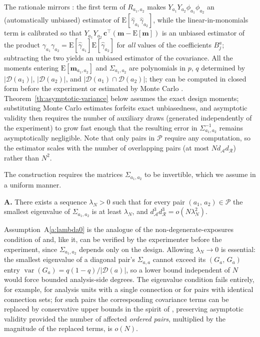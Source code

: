 \documentclass[sigconf]{acmart}
\newcounter{assumption}
\newenvironment{assumption}{\refstepcounter{assumption}\par\medskip\noindent\textbf{A\theassumption.}\enspace}{\par\medskip}
\newcommand{\E}{\mathrm E}
\DeclareMathOperator{\var}{var}
\begin{document}
The rationale mirrors \cite[Section~5.1]{harshaw2023erl}: the first term of $R_{a_1,a_2}$ makes $Y_{a_1}Y_{a_2}\phi_{a_1}\phi_{a_2}$ an (automatically unbiased) estimator of $\E[\hat\gamma_{a_1}\hat\gamma_{a_2}]$, while the linear-in-monomials term is calibrated so that $Y_{a_1}Y_{a_2}\,\mathbf c^{\top}(\mathbf m-\E[\mathbf m])$ is an unbiased estimator of the product $\gamma_{a_1}\gamma_{a_2}=\E[\hat\gamma_{a_1}]\E[\hat\gamma_{a_2}]$ for \emph{all} values of the coefficients $B^a_j$; subtracting the two yields an unbiased estimator of the covariance. All the moments entering $\E[\mathbf m_{a_1,a_2}]$ and $\Sigma_{a_1,a_2}$ are polynomials in $p$, $q$ determined by $|\mathcal D(a_1)|$, $|\mathcal D(a_2)|$, and $|\mathcal D(a_1)\cap\mathcal D(a_2)|$; they can be computed in closed form before the experiment or estimated by Monte Carlo \cite{fattorini2006applying}. Theorem~\ref{th:asymptotic-variance} below assumes the exact design moments; substituting Monte Carlo estimates forfeits exact unbiasedness, and asymptotic validity then requires the number of auxiliary draws (generated independently of the experiment) to grow fast enough that the resulting error in $\Sigma^{-1}_{a_1,a_2}$ remains asymptotically negligible. Note that only pairs in $\mathcal P$ require any computation, so the estimator scales with the number of overlapping pairs (at most $Nd_{\mathcal A}d_{\mathcal R}$) rather than $N^2$.

The construction requires the matrices $\Sigma_{a_1,a_2}$ to be invertible, which we assume in a uniform manner.

\begin{assumption}\label{a:lambda0}
    There exists a sequence $\lambda_N>0$ such that for every pair $(a_1,\,a_2)\in\mathcal P$ the smallest eigenvalue of $\Sigma_{a_1,a_2}$ is at least $\lambda_N$, and $d^{3}_{\mathcal A}d^{3}_{\mathcal R} = o(N\lambda_N^2)$.
\end{assumption}

Assumption~A\ref{a:lambda0} is the analogue of the non-degenerate-exposures condition of \cite[Assumption~4]{harshaw2023erl} and, like it, can be verified by the experimenter before the experiment, since $\Sigma_{a_1,a_2}$ depends only on the design. Allowing $\lambda_N\to0$ is essential: the smallest eigenvalue of a diagonal pair's $\Sigma_{a,a}$ cannot exceed its $(G_a,\,G_a)$ entry $\var(G_a) = q(1-q)/|\mathcal D(a)|$, so a lower bound independent of $N$ would force bounded analysis-side degrees. The eigenvalue condition fails entirely, for example, for analysis units with a single connection or for pairs with identical connection sets; for such pairs the corresponding covariance terms can be replaced by conservative upper bounds in the spirit of \cite[Proposition~5.2]{harshaw2023erl}, preserving asymptotic validity provided the number of affected \emph{ordered pairs}, multiplied by the magnitude of the replaced terms, is $o(N)$.
\end{document}
